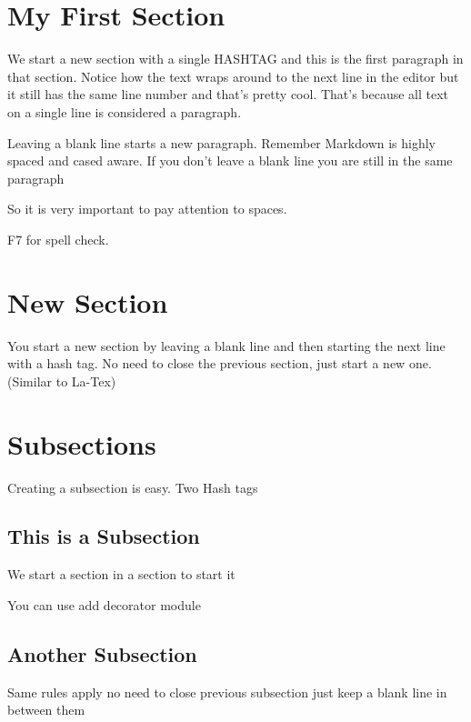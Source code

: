 \documentclass[]{article}
\begin{document}
\hypertarget{my-first-section}{%
\section{My First Section}\label{my-first-section}}

We start a new section with a single HASHTAG and this is the first
paragraph in that section. Notice how the text wraps around to the next
line in the editor but it still has the same line number and that's
pretty cool. That's because all text on a single line is considered a
paragraph.

Leaving a blank line starts a new paragraph. Remember Markdown is highly
spaced and cased aware. If you don't leave a blank line you are still in
the same paragraph

So it is very important to pay attention to spaces.

F7 for spell check.

\hypertarget{new-section}{%
\section{New Section}\label{new-section}}

You start a new section by leaving a blank line and then starting the
next line with a hash tag. No need to close the previous section, just
start a new one. (Similar to La-Tex)

\hypertarget{subsections}{%
\section{Subsections}\label{subsections}}

Creating a subsection is easy. Two Hash tags

\hypertarget{this-is-a-subsection}{%
\subsection{This is a Subsection}\label{this-is-a-subsection}}

We start a section in a section to start it

You can use add decorator module

\hypertarget{another-subsection}{%
\subsection{Another Subsection}\label{another-subsection}}

Same rules apply no need to close previous subsection just keep a blank
line in between them
\end{document}
